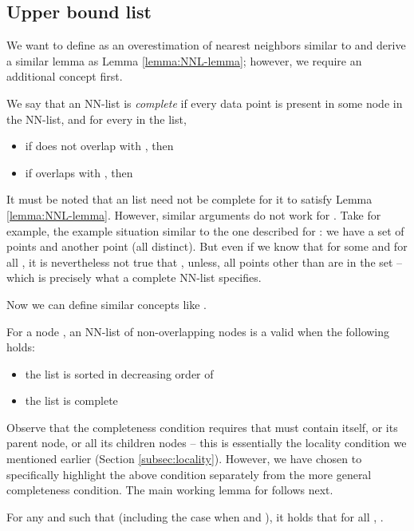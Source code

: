 \documentclass[prodmode,letterpaper]{acmsmall}
\begin{document}
\subsection{Upper bound list }\label{sec:nn-u}
We want to define  as an overestimation of nearest neighbors similar to
 and derive a similar lemma as Lemma \ref{lemma:NNL-lemma}; however, we
require an additional concept first.


\begin{definition}
    We say that an NN-list  is {\em complete} if every data
    point is present in some node in the NN-list, and for every  in the list, 
\begin{itemize}
\item if  does not overlap with , then 
\item if  overlaps with , then 
\end{itemize}
\end{definition}

It must
be noted that an  list need not be complete for it to satisfy Lemma
\ref{lemma:NNL-lemma}. However,
similar arguments do not work for . Take for example, the example
situation similar to
the one described for : we have a set of points  and another point  (all distinct). But even if we know that
 for some  and for all , it is nevertheless not true
that , unless, all points other than  are in the set --
which is precisely what a complete NN-list specifies.

Now we can define similar concepts like .
\begin{definition}
For a node , an NN-list  of non-overlapping nodes is a valid  when the following holds:
\begin{itemize}
\item the list is sorted in decreasing order of 
\item the list is complete
\end{itemize}
\end{definition}


Observe that the completeness condition requires that  must contain 
itself, or its parent node, or all its children nodes -- this is essentially
the locality condition we mentioned earlier (Section \ref{subsec:locality}).
However, we have chosen to specifically highlight the above condition separately
from the more general completeness condition.
The main working lemma for  follows next.
\begin{lemma}\label{lemma:NNU-lemma}
    For any  and  such that  (including the case when  and ), it holds that for all , .
\end{lemma}
\end{document}
